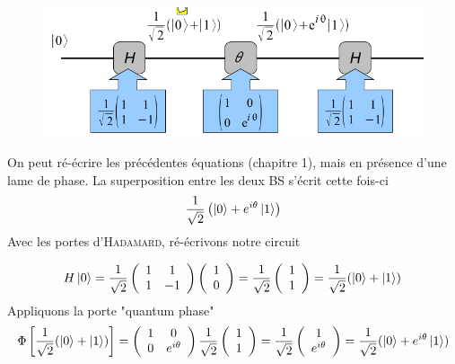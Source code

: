 	\begin{figure}
	\includegraphics[scale=0.2]{ch3/image3}
	\end{figure}
On peut ré-écrire les précédentes équations (chapitre 1), mais en présence d'une lame de phase.
La superposition entre les deux BS s'écrit cette fois-ci
\begin{equation}
\frac{1}{\sqrt{2}}\left(\ket0+e^{i\theta}\ket1\right)
\end{equation}
Avec les portes d'\textsc{Hadamard}, ré-écrivons notre circuit

\begin{equation}
H\ket0 = \frac{1}{\sqrt{2}}\left(\begin{array}{cc}
1&1\\
1&-1
\end{array}\right)\left(\begin{array}{c}
1\\
0
\end{array}\right)=\frac{1}{\sqrt{2}}\left(\begin{array}{c}
1\\
1
\end{array}\right) = \frac{1}{\sqrt{2}}(\ket0+\ket1)
\end{equation}
Appliquons la porte "quantum phase"
\begin{equation}
\Phi\left[\frac{1}{\sqrt{2}}(\ket0+\ket1)\right]=\left(\begin{array}{cc}
1&0\\
0&e^{i\theta}
\end{array}\right)\frac{1}{\sqrt{2}}\left(\begin{array}{c}
1\\
1
\end{array}\right)=\frac{1}{\sqrt{2}}\left(\begin{array}{c}
1\\
e^{i\theta}
\end{array}\right)=\frac{1}{\sqrt{2}}(\ket0+e^{i\theta}\ket1)
\end{equation}


